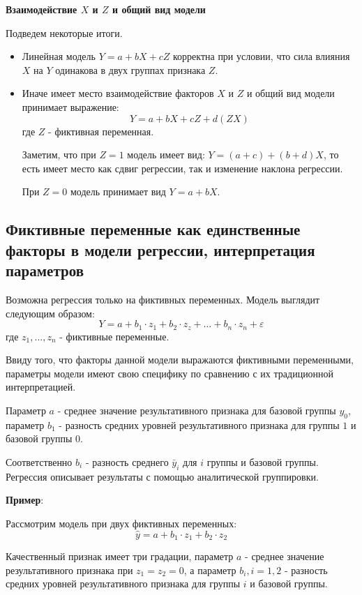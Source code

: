 \documentclass[aps,%
12pt,%
final,%
oneside,
onecolumn,%
musixtex, %
superscriptaddress,%
centertags]{article} %
\theoremstyle{plain}
\theoremstyle{definition}
\theoremstyle{remark}
\begin{document}
\textbf{Взаимодействие $X$ и $Z$ и общий вид модели}

Подведем некоторые итоги.

\begin{itemize}
	\item Линейная модель $Y = a + bX + cZ$ корректна при условии, что сила влияния $X$ на $Y$ одинакова в двух группах признака $Z$.
	\item Иначе имеет место взаимодействие факторов $X$ и $Z$ и общий вид модели принимает выражение:
	$$Y = a + bX + cZ +d(ZX)$$
	где $Z$ - фиктивная переменная.

	Заметим, что при $Z=1$ модель имеет вид: $Y = (a+c) + (b+d)X$, то есть имеет место как сдвиг регрессии, так и изменение наклона регрессии. 

	При $Z=0$ модель принимает вид $Y = a + bX$.
\end{itemize}

\newpage
\subsection{Фиктивные переменные как единственные факторы в модели регрессии, интерпретация параметров}

Возможна регрессия только на фиктивных переменных. Модель выглядит следующим образом:
$$Y = a + b_1 \cdot z_1  + b_2 \cdot z_z + \ldots + b_n \cdot z_n  + \varepsilon$$
где $z_1, \ldots, z_n$ - фиктивные переменные.

Ввиду того, что факторы данной модели выражаются фиктивными переменными, параметры модели имеют свою специфику по сравнению с их традиционной интерпретацией. 

Параметр $a$ - среднее значение результативного признака для базовой группы $y_0$, параметр $b_1$ - разность средних уровней результативного признака для группы $1$ и базовой группы $0$.

Соответственно $b_i$ - разность среднего $\bar{y}_i$ для $i$ группы и базовой группы. Регрессия описывает результаты с помощью аналитической группировки.

\textbf{Пример}: 

Рассмотрим модель при двух фиктивных переменных:
$$\hat{y} = a + b_1 \cdot z_1 + b_2 \cdot z_2$$

Качественный признак имеет три градации, параметр $a$ - среднее значение результативного признака при $z_1=z_2=0$, а параметр $b_i, i = 1,2$ - разность средних уровней результативного признака для группы $i$ и базовой группы.
\end{document}
